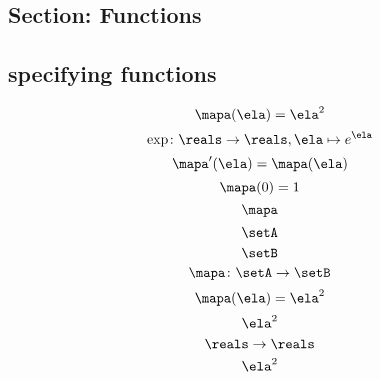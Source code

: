 \begin{forslides}
    \subsection{Section: Functions}

    \subsection{specifying functions}

    \begin{equation}\label{eq:slides_session2_76}
        \mapa(\ela)=\ela^2
    \end{equation}
    \begin{equation}\label{eq:slides_session2_77}
        \exp \colon \reals \to \reals, \ela \mapsto e^\ela
    \end{equation}
    \begin{equation}\label{eq:slides_session2_78}
        \mapa'(\ela) = \mapa(\ela)
    \end{equation}
    \begin{equation}\label{eq:slides_session2_79}
        \mapa(0) =1
    \end{equation}
    \begin{equation}\label{eq:slides_session2_80}
        \mapa
    \end{equation}
    \begin{equation}\label{eq:slides_session2_81}
        \setA
    \end{equation}
    \begin{equation}\label{eq:slides_session2_82}
        \setB
    \end{equation}
    \begin{equation}\label{eq:slides_session2_83}
        \mapa\colon \setA \to \setB
    \end{equation}
    \begin{equation}\label{eq:slides_session2_84}
        \mapa(\ela)=\ela^2
    \end{equation}
    \begin{equation}\label{eq:slides_session2_85}
        \ela^2
    \end{equation}
    \begin{equation}\label{eq:slides_session2_86}
        \reals \to \reals
    \end{equation}
    \begin{equation}\label{eq:slides_session2_87}
        \ela^2
    \end{equation}
    \begin{equation}\label{eq:slides_session2_88}

\end{equation}
\end{forslides}
